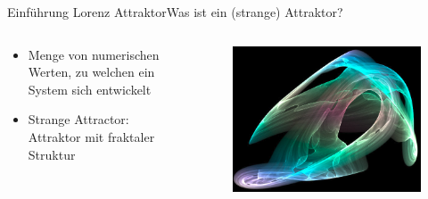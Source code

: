 \documentclass[presentation.tex]{subfiles}
\begin{document}
    \begin{frame}{Einführung Lorenz Attraktor}{Was ist ein (strange) Attraktor?}
		
		
		
		\begin{columns}[c]
			\begin{column}{.6\textwidth}
				\begin{itemize}
					\item Menge von numerischen Werten, zu welchen ein System sich entwickelt
					\item Strange Attractor: Attraktor mit fraktaler Struktur
				\end{itemize}
			\end{column}
			\begin{column}{.4\textwidth}
				\begin{figure}
					\centering
					\includegraphics[width=1\linewidth]{Attractor}
					\label{fig:Attractor}
				\end{figure}
			\end{column}
		\end{columns}
    \end{frame}
    
    \begin{frame}
    \end{frame}
    
\end{document}
